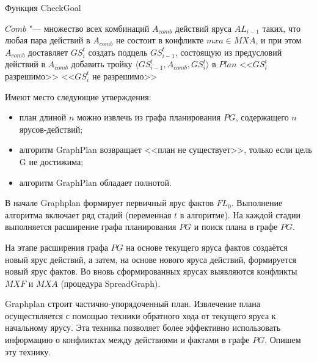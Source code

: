 \documentclass[b5paper,11pt]{book}
\numberwithin{Def}{section}
\numberwithin{Th}{chapter}
\numberwithin{St}{chapter}
\begin{document}
	\begin{algorithm}[h]
		\caption{Функция CheckGoal}\label{alg:checkgoal}
		\begin{algorithmic}[1]
				\Statex{}
				\Statex{}
				\State $Comb$ "--- множество всех комбинаций $A_{comb}$ действий яруса $AL_{i-1}$ таких, что любая пара действий в $A_{comb}$ не состоит в конфликте $mxa \in MXA$, и при этом $A_{comb}$ доставляет $GS_i^t$
					\State создать подцель $GS_{i-1}^t$, состоящую из предусловий действий в $A_{comb}$
				\EndFor
					\State добавить тройку $\langle GS_{i-1}^t, A_{comb}, GS_i^t\rangle$ в $Plan$
					\State\Return <<$GS_i^t$ разрешимо>>
					\State\Return <<$GS_i^t$ не разрешимо>>
				\EndIf
			\EndFunction
		\end{algorithmic}
	\end{algorithm}
	
	Имеют место следующие утверждения: 
	\begin{itemize}
		\item план длиной $n$ можно извлечь из графа планирования $PG$, содержащего $n$ ярусов-действий;
		\item алгоритм GraphPlan возвращает <<план не существует>>, только если цель G не достижима;
		\item алгоритм GraphPlan обладает полнотой.
	\end{itemize}

	В начале Graphplan формирует первичный ярус фактов $FL_0$. Выполнение алгоритма включает ряд стадий (переменная $t$ в алгоритме). На каждой стадии выполняется расширение графа планирования $PG$ и поиск плана в графе $PG$.
	
	На этапе расширения графа $PG$ на основе текущего яруса фактов создаётся новый ярус действий, а затем, на основе нового яруса действий,	формируется новый ярус фактов. Во вновь сформированных ярусах выявляются конфликты $MXF$ и $MXA$ (процедура SpreadGraph).
	
	Graphplan строит частично-упорядоченный план. Извлечение плана осуществляется с помощью техники обратного хода от текущего яруса к начальному ярусу. Эта техника позволяет более эффективно использовать	информацию о конфликтах между действиями и фактами в графе $PG$. Опишем эту технику.
	
\end{document}

